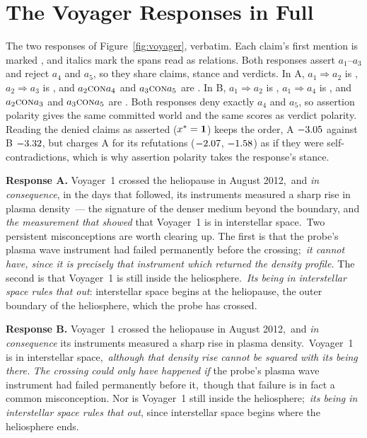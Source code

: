 \section{The Voyager Responses in Full}
\label{app:voyager}

The two responses of Figure~\ref{fig:voyager}, verbatim. Each claim's first mention is marked
, and italics mark the spans read as relations. Both responses assert $a_1$--$a_3$ and
reject $a_4$ and $a_5$, so they share claims, stance and verdicts. In A, $a_1\Rightarrow a_2$ is
, $a_2\Rightarrow a_3$ is , and $a_2\textsc{con} a_4$ and
$a_3\textsc{con} a_5$ are . In B, $a_1\Rightarrow a_2$ is ,
$a_1\Rightarrow a_4$ is , and $a_2\textsc{con} a_3$ and $a_3\textsc{con} a_5$ are
. Both responses deny exactly $a_4$ and $a_5$, so assertion polarity gives the
same committed world and the same scores as verdict polarity. Reading the denied claims as asserted
($x^{\ast}=\mathbf{1}$) keeps the order, A $-3.05$ against B $-3.32$, but charges A for its
refutations ($-2.07$, $-1.58$) as if they were self-contradictions, which is why
assertion polarity takes the response's stance.

\smallskip\noindent\textbf{Response A.}
Voyager~1 crossed the heliopause in August 2012,\, and \emph{in consequence}, in the
days that followed, its instruments measured a sharp rise in plasma density\, --- the
signature of the denser medium beyond the boundary, and \emph{the measurement that showed} that
Voyager~1 is in interstellar space.\, Two persistent misconceptions are worth clearing
up. The first is that the probe's plasma wave instrument had failed permanently before the
crossing;\, \emph{it cannot have, since it is precisely that instrument which returned
the density profile.} The second is that Voyager~1 is still inside the
heliosphere.\, \emph{Its being in interstellar space rules that out}: interstellar
space begins at the heliopause, the outer boundary of the heliosphere, which the probe has
crossed.

\smallskip\noindent\textbf{Response B.}
Voyager~1 crossed the heliopause in August 2012,\, and \emph{in consequence} its
instruments measured a sharp rise in plasma density.\, Voyager~1 is in interstellar
space,\, \emph{although that density rise cannot be squared with its being there.}
\emph{The crossing could only have happened if} the probe's plasma wave instrument had failed
permanently before it,\, though that failure is in fact a common misconception. Nor is
Voyager~1 still inside the heliosphere;\, \emph{its being in interstellar space
rules that out}, since interstellar space begins where the heliosphere ends.

